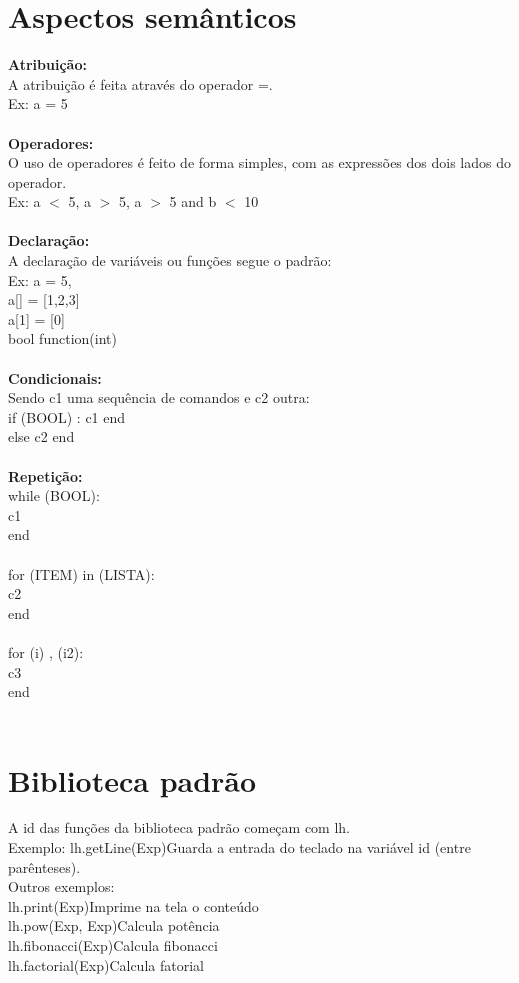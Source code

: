 \documentclass[letterpaper,12pt]{article}
\begin{document}
\section{Aspectos sem\^anticos}
\textbf{Atribui\c{c}\~ao:}\\
A atribui\c{c}\~ao \'e feita atrav\'es do operador =.\\
Ex: a = 5\\
\\
\textbf{Operadores:}\\
O uso de operadores \'e feito de forma simples, com as express\~oes dos dois lados do operador.\\
Ex: a $<$ 5, a $>$ 5, a $>$ 5 and b $<$ 10\\
\\
\textbf{Declara\c{c}\~ao:}\\
A declara\c{c}\~ao de vari\'aveis ou fun\c{c}\~oes segue o padr\~ao:\\
Ex: a = 5,\\
a[] = [1,2,3]\\
a[1] = [0]\\
bool function(int)\\
\\
\textbf{Condicionais:}\\
Sendo c1 uma sequ\^encia de comandos e c2 outra:\\
if (BOOL) : c1 end\\
else c2 end\\
\\
\textbf{Repeti\c{c}\~ao:}\\
while (BOOL):\\
    c1\\
end\\
\\
for (ITEM) in (LISTA):\\
    c2\\
end\\
\\
for (i) , (i2):\\
    c3\\
end\\
\\
\section{Biblioteca padr\~ao}
A id das fun\c{c}\~oes da biblioteca padr\~ao come\c{c}am com lh.\\
Exemplo: lh.getLine(Exp)\hspace*{8mm}Guarda a entrada do teclado na vari\'avel id (entre par\^enteses).\\
Outros exemplos:\\
lh.print(Exp)\hspace*{24mm}Imprime na tela o conte\'udo\\
lh.pow(Exp, Exp)\hspace*{24mm}Calcula pot\^encia\\
lh.fibonacci(Exp)\hspace*{24mm}Calcula fibonacci\\
lh.factorial(Exp)\hspace*{24mm}Calcula fatorial\\
\\
\\
\end{document}

